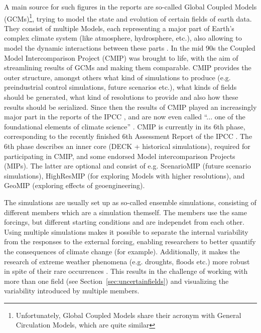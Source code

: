 A main source for such figures in the reports are so-called Global Coupled Models (GCMs)\footnote{Unfortunately, Global Coupled Models share their acronym with General Circulation Models, which are quite similar}, trying to model the state and evolution of certain fields of earth data.
They consist of multiple Models, each representing a major part of Earth's complex climate system (like atmosphere, hydrosphere, etc.), also allowing to model the dynamic interactions between these parts \cite{vietinghoffdiss}. 
In the mid 90s the Coupled Model Intercomparison Project (CMIP) was brought to life, with the aim of streamlining results of GCMs and making them comparable. 
CMIP provides the outer structure, amongst others what kind of simulations to produce (e.g. preindustrial control simulations, future scenarios etc.), what kinds of fields should be generated, what kind of resolutions to provide and also how these results should be serialized.
Since then the results of CMIP played an increasingly major part in the reports of the IPCC \cite{touzepeiffer_coupled_2020}, and are now even called \enquote{... one of the foundational elements of climate science} \cite{eyring_overview_2016}. 
CMIP is currently in its 6th phase, corresponding to the recently finished 6th Assessment Report of the IPCC \cite{lee2024climate}. 
The 6th phase describes an inner core (DECK + historical simulations), required for participating in CMIP, and some endorsed Model intercomparison Projects (MIPs). 
The latter are optional and consist of e.g. ScenarioMIP (future scenario simulations), HighResMIP (for exploring Models with higher resolutions), and GeoMIP (exploring effects of geoengineering).

The simulations are usually set up as so-called ensemble simulations, consisting of different members which are a simulation themself. 
The members use the same forcings, but different starting conditions and are independet from each other. 
Using multiple simulations makes it possible to separate the internal variability from the responses to the external forcing, enabling researchers to better quantify the consequences of climate change (for example). 
Additionally, it makes the research of extreme weather phenomena (e.g. droughts, floods etc.) more robust in spite of their rare occurrences \cite{maher_large_2021}.
This results in the challenge of working with more than one field (see Section~\ref{sec:uncertainfields}) and visualizing the variability introduced by multiple members. 



